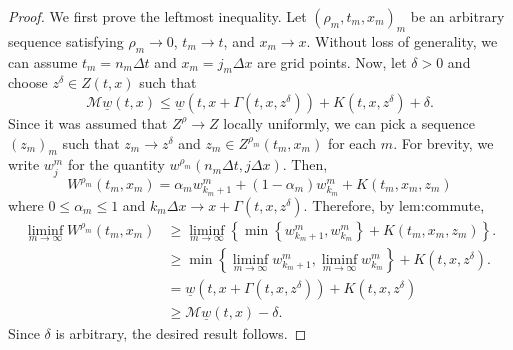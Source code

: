 \documentclass[12pt]{article}
\begin{document}
\begin{proof}
We first prove the leftmost inequality. Let
$(\rho_{m},t_{m},x_{m})_{m}$ be an arbitrary sequence satisfying
$\rho_{m}\rightarrow0$, $t_{m}\rightarrow t$, and $x_{m}\rightarrow x$.
Without loss of generality, we can assume $t_{m}=n_{m}\Delta t$ and
$x_{m}=j_{m}\Delta x$ are grid points. Now, let $\delta>0$ and choose
$z^{\delta}\in Z(t,x)$ such that
\[
\mathcal{M}\underline{w}(t,x){\leqslant}\underline{w}(t,x+\Gamma(t,x,z^{\delta}))+K(t,x,z^{\delta})+\delta.
\]
Since it was assumed that $Z^{\rho}\rightarrow Z$ locally uniformly,
we can pick a sequence $(z_{m})_{m}$ such that $z_{m}\rightarrow z^{\delta}$
and $z_{m}\in Z^{\rho_{m}}(t_{m},x_{m})$ for each $m$. For brevity,
we write $w_{j}^{m}$ for the quantity $w^{\rho_{m}}(n_{m}\Delta t,j\Delta x)$.
Then,
\[
W^{\rho_{m}}(t_{m},x_{m})=\alpha_{m}w_{k_{m}+1}^{m}+(1-\alpha_{m})w_{k_{m}}^{m}+K(t_{m},x_{m},z_{m})
\]
where $0{\leqslant}\alpha_{m}{\leqslant}1$ and $k_{m}\Delta x\rightarrow x+\Gamma(t,x,z^{\delta})$.
Therefore, by {\prettyref}{lem:commute},
\begin{align*}
\liminf_{m\rightarrow\infty}W^{\rho_{m}}(t_{m},x_{m}) & {\geqslant}\liminf_{m\rightarrow\infty}\left\{ \min\left\{ w_{k_{m}+1}^{m},w_{k_{m}}^{m}\right\} +K(t_{m},x_{m},z_{m})\right\} .\\
 & {\geqslant}\min\left\{ \liminf_{m\rightarrow\infty}w_{k_{m}+1}^{m},\liminf_{m\rightarrow\infty}w_{k_{m}}^{m}\right\} +K(t,x,z^{\delta}).\\
 & =\underline{w}(t,x+\Gamma(t,x,z^{\delta}))+K(t,x,z^{\delta})\\
 & {\geqslant}\mathcal{M}\underline{w}(t,x)-\delta.
\end{align*}
Since $\delta$ is arbitrary, the desired result follows.


\end{proof}
\end{document}
